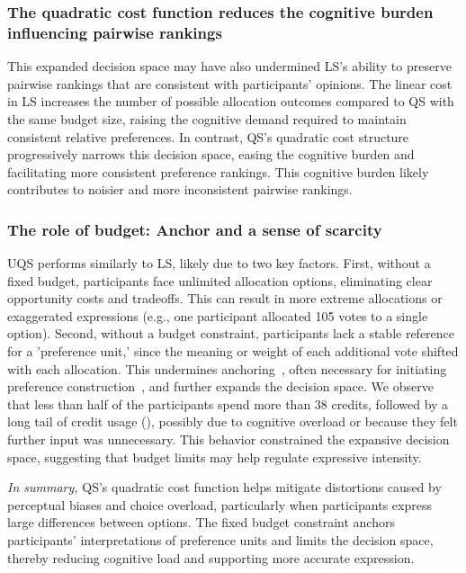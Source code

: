 \subsubsection{The quadratic cost function reduces the cognitive burden influencing pairwise rankings}
This expanded decision space may have also undermined LS's ability to preserve pairwise rankings that are consistent with participants' opinions. The linear cost in LS increases the number of possible allocation outcomes compared to QS with the same budget size, raising the cognitive demand required to maintain consistent relative preferences. In contrast, QS's quadratic cost structure progressively narrows this decision space, easing the cognitive burden and facilitating more consistent preference rankings. This cognitive burden likely contributes to noisier and more inconsistent pairwise rankings. %

\subsubsection{The role of budget: Anchor and a sense of scarcity}
UQS performs similarly to LS, likely due to two key factors. First, without a fixed budget, participants face unlimited allocation options, eliminating clear opportunity costs and tradeoffs. This can result in more extreme allocations or exaggerated expressions (e.g., one participant allocated 105 votes to a single option). Second, without a budget constraint, participants lack a stable reference for a 'preference unit,' since the meaning or weight of each additional vote shifted with each allocation. This undermines anchoring~\cite{daniel2017thinking, tverskyJudgmentUncertaintyHeuristics1974}, often necessary for initiating preference construction~\cite{lichtensteinConstructionPreference2006}, and further expands the decision space. We observe that less than half of the participants spend more than 38 credits, followed by a long tail of credit usage (), possibly due to cognitive overload or because they felt further input was unnecessary. This behavior constrained the expansive decision space, suggesting that budget limits may help regulate expressive intensity.

\textit{In summary,} QS's quadratic cost function helps mitigate distortions caused by perceptual biases and choice overload, particularly when participants express large differences between options. The fixed budget constraint anchors participants' interpretations of preference units and limits the decision space, thereby reducing cognitive load and supporting more accurate expression.

